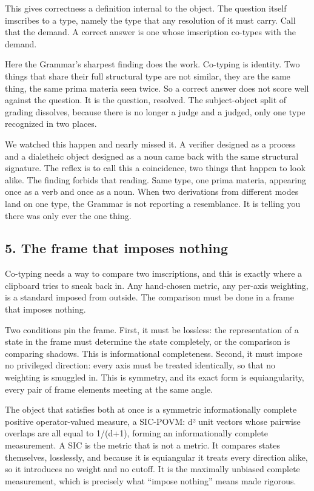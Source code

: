 \documentclass[12pt,a4paper]{article}
\begin{document}
This gives correctness a definition internal to the object. The question
itself imscribes to a type, namely the type that any resolution of it
must carry. Call that the demand. A correct answer is one whose
imscription co-types with the demand.

Here the Grammar's sharpest finding does the work. Co-typing is
identity. Two things that share their full structural type are not
similar, they are the same thing, the same prima materia seen twice. So
a correct answer does not score well against the question. It is the
question, resolved. The subject-object split of grading dissolves,
because there is no longer a judge and a judged, only one type
recognized in two places.

We watched this happen and nearly missed it. A verifier designed as a
process and a dialetheic object designed as a noun came back with the
same structural signature. The reflex is to call this a coincidence, two
things that happen to look alike. The finding forbids that reading. Same
type, one prima materia, appearing once as a verb and once as a noun.
When two derivations from different modes land on one type, the Grammar
is not reporting a resemblance. It is telling you there was only ever
the one thing.

\hypertarget{the-frame-that-imposes-nothing}{%
\subsection{5. The frame that imposes
nothing}\label{the-frame-that-imposes-nothing}}

Co-typing needs a way to compare two imscriptions, and this is exactly
where a clipboard tries to sneak back in. Any hand-chosen metric, any
per-axis weighting, is a standard imposed from outside. The comparison
must be done in a frame that imposes nothing.

Two conditions pin the frame. First, it must be lossless: the
representation of a state in the frame must determine the state
completely, or the comparison is comparing shadows. This is
informational completeness. Second, it must impose no privileged
direction: every axis must be treated identically, so that no weighting
is smuggled in. This is symmetry, and its exact form is equiangularity,
every pair of frame elements meeting at the same angle.

The object that satisfies both at once is a symmetric informationally
complete positive operator-valued measure, a SIC-POVM: d² unit vectors
whose pairwise overlaps are all equal to 1/(d+1), forming an
informationally complete measurement. A SIC is the metric that is not a
metric. It compares states themselves, losslessly, and because it is
equiangular it treats every direction alike, so it introduces no weight
and no cutoff. It is the maximally unbiased complete measurement, which
is precisely what ``impose nothing'' means made rigorous.
\end{document}
